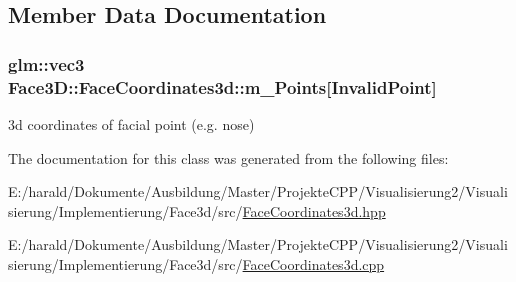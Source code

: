 \subsection{Member Data Documentation}
\subsubsection[{\texorpdfstring{m\+\_\+\+Points}{m_Points}}]{\setlength{\rightskip}{0pt plus 5cm}glm\+::vec3 Face3\+D\+::\+Face\+Coordinates3d\+::m\+\_\+\+Points\mbox{[}{\bf Invalid\+Point}\mbox{]}\hspace{0.3cm}{\ttfamily [private]}}\hypertarget{class_face3_d_1_1_face_coordinates3d_aa4646a4766c4c5a8ce010ec05f49ffab}{}\label{class_face3_d_1_1_face_coordinates3d_aa4646a4766c4c5a8ce010ec05f49ffab}
3d coordinates of facial point (e.\+g. nose) 

The documentation for this class was generated from the following files\+:\begin{DoxyCompactItemize}
\item 
E\+:/harald/\+Dokumente/\+Ausbildung/\+Master/\+Projekte\+C\+P\+P/\+Visualisierung2/\+Visualisierung/\+Implementierung/\+Face3d/src/\hyperlink{_face_coordinates3d_8hpp}{Face\+Coordinates3d.\+hpp}\item 
E\+:/harald/\+Dokumente/\+Ausbildung/\+Master/\+Projekte\+C\+P\+P/\+Visualisierung2/\+Visualisierung/\+Implementierung/\+Face3d/src/\hyperlink{_face_coordinates3d_8cpp}{Face\+Coordinates3d.\+cpp}\end{DoxyCompactItemize}
